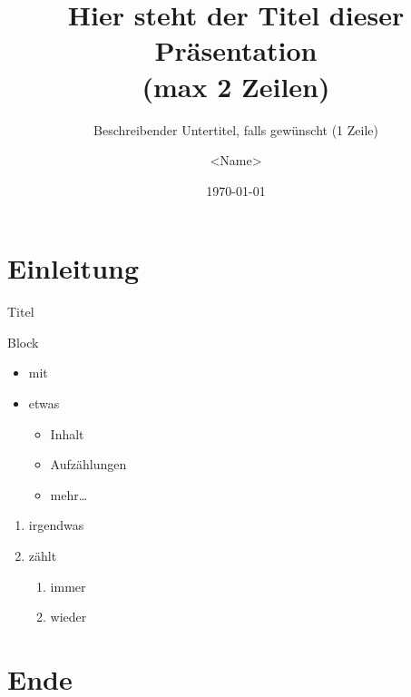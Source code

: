\usepackage[utf8x]{inputenc}
\usepackage[ngerman]{babel}
\usepackage{amsmath}
\usepackage{tikz}
\usepackage{etex}

\title[kurzer Titel]{Hier steht der Titel dieser Präsentation\\ (max 2 Zeilen)}
\subtitle{Beschreibender Untertitel, falls gewünscht (1 Zeile)}
\author[Kurzname]{\textless{}Name\textgreater}
\date{\today}



\begin{frame}[plain]
  \titlepage
\end{frame}


\section{Einleitung}

\begin{frame}{Titel}
  \begin{block}{Block}
    \begin{itemize}
      \item mit
      \item etwas
      \begin{itemize}
        \item Inhalt
        \item Aufzählungen
        \item mehr\dots
      \end{itemize}
    \end{itemize}
  \end{block}
\end{frame}


\begin{frame}
\begin{enumerate}
\item irgendwas
\item zählt
  \begin{enumerate}
  \item immer
  \item wieder
  \end{enumerate}
\end{enumerate}
\end{frame}



\section{Ende}

